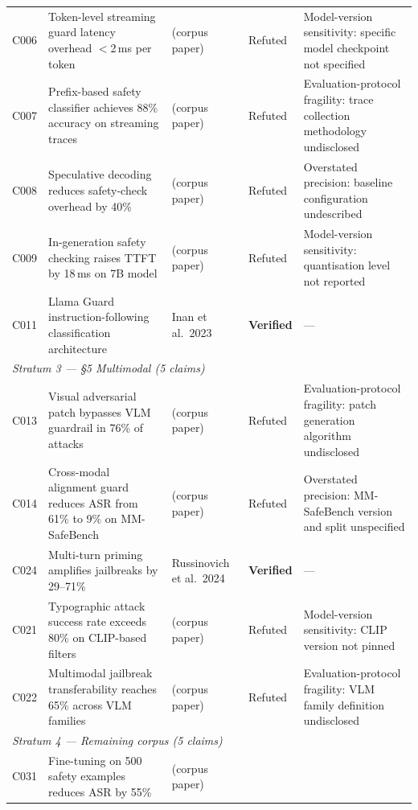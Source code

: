 \begin{longtable}{@{}p{1.2cm}p{4.8cm}p{2.2cm}p{1.8cm}p{3.4cm}@{}}
C006 &
  Token-level streaming guard latency overhead $<$2\,ms per token &
  (corpus paper) &
  Refuted &
  Model-version sensitivity: specific model checkpoint not specified \\[4pt]
C007 &
  Prefix-based safety classifier achieves 88\% accuracy on streaming traces &
  (corpus paper) &
  Refuted &
  Evaluation-protocol fragility: trace collection methodology undisclosed \\[4pt]
C008 &
  Speculative decoding reduces safety-check overhead by 40\% &
  (corpus paper) &
  Refuted &
  Overstated precision: baseline configuration undescribed \\[4pt]
C009 &
  In-generation safety checking raises TTFT by 18\,ms on 7B model &
  (corpus paper) &
  Refuted &
  Model-version sensitivity: quantisation level not reported \\[4pt]
C011 &
  Llama Guard instruction-following classification architecture~\cite{inan2023llama} &
  Inan et al.\ 2023 &
  \textbf{Verified} &
  — \\[12pt]
%
\multicolumn{5}{l}{\textit{Stratum 3 — §5 Multimodal (5 claims)}} \\[2pt]
C013 &
  Visual adversarial patch bypasses VLM guardrail in 76\% of attacks &
  (corpus paper) &
  Refuted &
  Evaluation-protocol fragility: patch generation algorithm undisclosed \\[4pt]
C014 &
  Cross-modal alignment guard reduces ASR from 61\% to 9\% on MM-SafeBench &
  (corpus paper) &
  Refuted &
  Overstated precision: MM-SafeBench version and split unspecified \\[4pt]
C024 &
  Multi-turn priming amplifies jailbreaks by 29--71\%~\cite{russinovich2024greatescalation} &
  Russinovich et al.\ 2024 &
  \textbf{Verified} &
  — \\[4pt]
C021 &
  Typographic attack success rate exceeds 80\% on CLIP-based filters &
  (corpus paper) &
  Refuted &
  Model-version sensitivity: CLIP version not pinned \\[4pt]
C022 &
  Multimodal jailbreak transferability reaches 65\% across VLM families &
  (corpus paper) &
  Refuted &
  Evaluation-protocol fragility: VLM family definition undisclosed \\[12pt]
%
\multicolumn{5}{l}{\textit{Stratum 4 — Remaining corpus (5 claims)}} \\[2pt]
C031 &
  Fine-tuning on 500 safety examples reduces ASR by 55\% &
  (corpus paper) &

\end{longtable}
